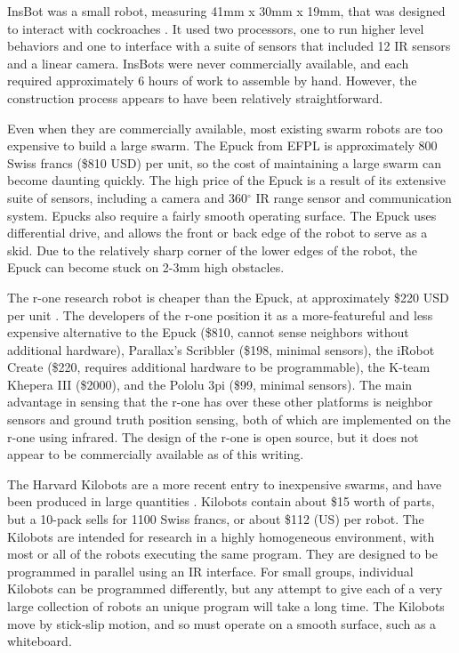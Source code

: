 \documentclass[]{article}
\begin{document}
InsBot was a small robot, measuring 41mm x 30mm x 19mm, that was designed to interact with cockroaches \cite{colot2004insbot}.
It used two processors, one to run higher level behaviors and one to interface with a suite of sensors that included 12 IR sensors and a linear camera. 
InsBots were never commercially available, and each required approximately 6 hours of work to assemble by hand. 
However, the construction process appears to have been relatively straightforward. 

Even when they are commercially available, most existing swarm robots are too expensive to build a large swarm.
The Epuck from EFPL is approximately 800 Swiss francs (\$810 USD) per unit, so the cost of maintaining a large swarm can become daunting quickly. 
The high price of the Epuck is a result of its extensive suite of sensors, including a camera and 360$^{\circ}$ IR range sensor and communication system. 
Epucks also require a fairly smooth operating surface.
The Epuck uses differential drive, and allows the front or back edge of the robot to serve as a skid. 
Due to the relatively sharp corner of the lower edges of the robot, the Epuck can become stuck on 2-3mm high obstacles. 

The r-one research robot is cheaper than the Epuck, at approximately \$220 USD per unit \cite{mclurkin2013low}. 
The developers of the r-one position it as a more-featureful and less expensive alternative to the Epuck (\$810, cannot sense neighbors without additional hardware), Parallax's Scribbler (\$198, minimal sensors), the iRobot Create (\$220, requires additional hardware to be programmable), the K-team Khepera III (\$2000), and the Pololu 3pi (\$99, minimal sensors). The main advantage in sensing that the r-one has over these other platforms is neighbor sensors and ground truth position sensing, both of which are implemented on the r-one using infrared.
The design of the r-one is open source, but it does not appear to be commercially available as of this writing.   

The Harvard Kilobots are a more recent entry to inexpensive swarms, and have been produced in large quantities \cite{rubenstein2014kilobot}. 
Kilobots contain about \$15 worth of parts, but a 10-pack sells for 1100 Swiss francs, or about \$112 (US) per robot. 
The Kilobots are intended for research in a highly homogeneous environment, with most or all of the robots executing the same program. 
They are designed to be programmed in parallel using an IR interface. 
For small groups, individual Kilobots can be programmed differently, but any attempt to give each of a very large collection of robots an unique program will take a long time. 
The Kilobots move by stick-slip motion, and so must operate on a smooth surface, such as a whiteboard. 
\end{document}

